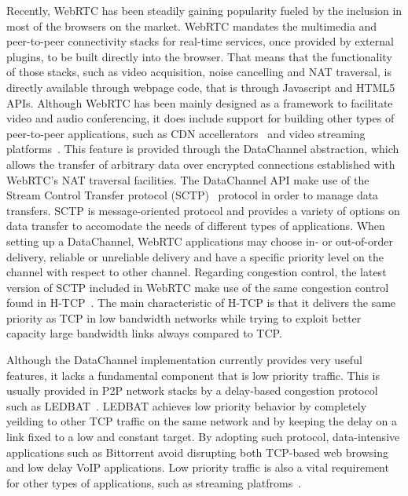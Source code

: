 \documentclass{sig-alternate}
\begin{document}

Recently, WebRTC has been steadily gaining popularity fueled by the inclusion in most of
the browsers on the market. WebRTC mandates the multimedia and peer-to-peer connectivity
stacks for real-time services, once provided by external plugins, to be built directly
into the browser. That means that the functionality of those stacks, such as video
acquisition, noise cancelling and NAT traversal, is directly available through webpage
code, that is through Javascript and HTML5 APIs. Although WebRTC has been mainly designed
as a framework to facilitate video and audio conferencing, it does include support for
building other types of peer-to-peer applications, such as CDN
accellerators~\cite{peerCDN} and video streaming platforms~\cite{nurminen2013p2p}. This
feature is provided through the DataChannel abstraction, which allows the transfer of
arbitrary data over encrypted connections established with WebRTC's NAT traversal
facilities. The DataChannel API make use of the Stream Control Transfer protocol
(SCTP)~\cite{sctp} protocol in order to manage data transfers. SCTP is message-oriented
protocol and provides a variety of options on data transfer to accomodate the needs of
different types of applications. When setting up a DataChannel, WebRTC applications may
choose in- or out-of-order delivery, reliable or unreliable delivery and have a specific
priority level on the channel with respect to other channel. Regarding congestion control,
the latest version of SCTP included in WebRTC make use of the same congestion control
found in H-TCP~\cite{htcp}. The main characteristic of H-TCP is that it delivers the same
priority as TCP in low bandwidth networks while trying to exploit better capacity large
bandwidth links always compared to TCP.

Although the DataChannel implementation currently provides very useful features, it lacks
a fundamental component that is low priority traffic. This is usually provided in P2P
network stacks by a delay-based congestion protocol such as LEDBAT~\cite{ledbat}. LEDBAT
achieves low priority behavior by completely yeilding to other TCP traffic on the same
network and by keeping the delay on a link fixed to a low and constant target. By adopting
such protocol, data-intensive applications such as Bittorrent avoid disrupting both
TCP-based web browsing and low delay VoIP applications. Low priority traffic is also a
vital requirement for other types of applications, such as streaming
platfroms~\cite{smoothcache}\cite{roberto-thesis}.
\end{document}
